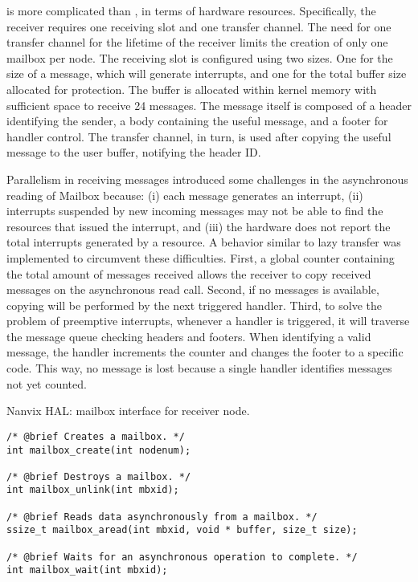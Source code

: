					\mailbox is more complicated than \sync, in terms of hardware resources.
					Specifically, the receiver requires one \dnoc receiving slot and one \cnoc
					transfer channel. The need for one transfer channel for the lifetime
					of the receiver limits the creation of only one mailbox per \noc node.
					The receiving slot is configured using two sizes. One for the size of
					a message, which will generate interrupts, and one for the total buffer
					size allocated for protection. The buffer is allocated within kernel
					memory with sufficient space to receive 24 messages. The message
					itself is composed of a header identifying the sender, a body containing
					the useful message, and a footer for handler control. The transfer channel,
					in turn, is used after copying the useful message to the user buffer,
					notifying the header ID.

					Parallelism in receiving messages introduced some challenges in the
					asynchronous reading of Mailbox because: (i) each message generates an
					interrupt, (ii) interrupts suspended by new incoming messages may
					not be able to find the \dnoc resources that issued the interrupt,
					and (iii) the hardware does not report the total interrupts generated
					by a resource. A behavior similar to lazy transfer was implemented
					to circumvent these difficulties.
					First, a global counter containing the total amount of messages
					received allows the receiver to copy received messages on the
					asynchronous read call. Second, if no messages is available, copying
					will be performed by the next triggered handler. Third, to solve the
					problem of preemptive interrupts, whenever a handler is triggered,
					it will traverse the message queue checking headers and footers.
					When identifying a valid message, the handler increments the counter
					and changes the footer to a specific code. This way, no message is
					lost because a single handler identifies messages not yet counted.

\begin{listing}[!tb]
\caption{Nanvix HAL: mailbox interface for receiver node.}
\label{code:hal-mailbox-receiver}
\begin{verbatim}
/* @brief Creates a mailbox. */
int mailbox_create(int nodenum);

/* @brief Destroys a mailbox. */
int mailbox_unlink(int mbxid);

/* @brief Reads data asynchronously from a mailbox. */
ssize_t mailbox_aread(int mbxid, void * buffer, size_t size);

/* @brief Waits for an asynchronous operation to complete. */
int mailbox_wait(int mbxid);
\end{verbatim}
\end{listing}

